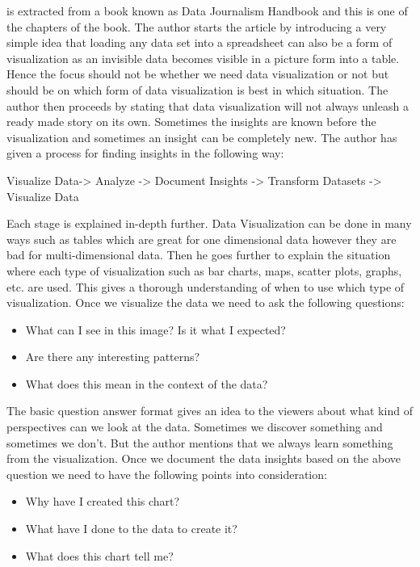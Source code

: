 \documentclass[]{book}
\providecommand{\tightlist}{%
  \setlength{\itemsep}{0pt}\setlength{\parskip}{0pt}}
\theoremstyle{definition}
\theoremstyle{definition}
\theoremstyle{definition}
\theoremstyle{remark}
\begin{document}
\citep{data_journ} is extracted from a book known as Data Journalism
Handbook and this is one of the chapters of the book. The author starts
the article by introducing a very simple idea that loading any data set
into a spreadsheet can also be a form of visualization as an invisible
data becomes visible in a picture form into a table. Hence the focus
should not be whether we need data visualization or not but should be on
which form of data visualization is best in which situation. The author
then proceeds by stating that data visualization will not always unleash
a ready made story on its own. Sometimes the insights are known before
the visualization and sometimes an insight can be completely new. The
author has given a process for finding insights in the following way:

Visualize Data-\textgreater{} Analyze -\textgreater{} Document Insights
-\textgreater{} Transform Datasets -\textgreater{} Visualize Data

Each stage is explained in-depth further. Data Visualization can be done
in many ways such as tables which are great for one dimensional data
however they are bad for multi-dimensional data. Then he goes further to
explain the situation where each type of visualization such as bar
charts, maps, scatter plots, graphs, etc. are used. This gives a
thorough understanding of when to use which type of visualization. Once
we visualize the data we need to ask the following questions:

\begin{itemize}
\tightlist
\item
  What can I see in this image? Is it what I expected?
\item
  Are there any interesting patterns?
\item
  What does this mean in the context of the data?
\end{itemize}

The basic question answer format gives an idea to the viewers about what
kind of perspectives can we look at the data. Sometimes we discover
something and sometimes we don't. But the author mentions that we always
learn something from the visualization. Once we document the data
insights based on the above question we need to have the following
points into consideration:

\begin{itemize}
\tightlist
\item
  Why have I created this chart?
\item
  What have I done to the data to create it?
\item
  What does this chart tell me?
\end{itemize}
\end{document}
